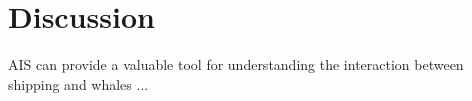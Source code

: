 \section{Discussion}


AIS can provide a valuable tool for understanding the interaction between shipping and whales \cite{Mckenna2012a}...







